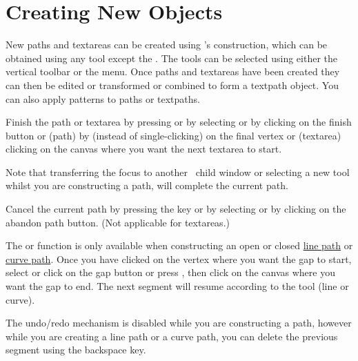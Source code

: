 \chapter{Creating New Objects}\label{sec:newobjects}


New \glspl{path} and \glspl{textarea} can be created using
\FlowframTk's \gls{construction}, which can be obtained using any tool
except the . The tools can be selected using either the
vertical \gls{toolbar} or the  menu. Once \glspl{path}
and \glspl{textarea} have been created they can then be edited or
transformed or combined to form a \gls{textpath} object. You can
also apply patterns to \glspl{path} or \glspl{textpath}.


Finish the \gls{path} or \gls{textarea} by pressing
 or by selecting 
or by clicking on the finish button or (\gls{path}) by
 (instead of single-clicking)
on the final vertex or (\gls{textarea}) clicking on the \gls{canvas}
where you want the next \gls{textarea} to start.  

Note that transferring the focus to
another \FlowframTk\ child window or selecting a new tool whilst you
are constructing a \gls{path}, will complete the current path.


Cancel the current \gls{path} by pressing the
 key or by selecting
 or by clicking on the abandon path button.
(Not applicable for \glspl{textarea}.)


The  or  function is only
available when constructing an open or closed
\hyperref[sec:newlinepath]{line path} or \hyperref[sec:newcurvepath]{curve
path}.  Once you have clicked on the vertex where you want the
\gls{gap} to start, select  or click on the
\gls{gap} button or press , then click
on the \gls{canvas} where you want the \gls{gap} to end. The next
segment will resume according to the tool (line or curve).

\begin{warning}
The undo/redo mechanism is disabled while you are constructing a
path, however while you are creating a line path or a curve path,
you can delete the previous segment using the
backspace  key.
\end{warning}

